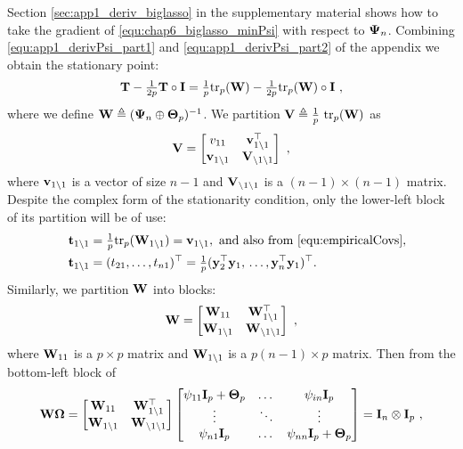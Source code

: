     Section \ref{sec:app1_deriv_biglasso} in the supplementary material shows how to take the gradient of \eqref{equ:chap6_biglasso_minPsi} with respect to $\mathbf{\Psi}_n$.
    Combining
    \eqref{equ:app1_derivPsi_part1} and \eqref{equ:app1_derivPsi_part2} of the appendix  we obtain the stationary point:
    \begin{equation*}
      \mathbf{T} - \tfrac{1}{2p} \mathbf{T} \circ \mathbf{I} = \tfrac{1}{p}\textrm{tr}_p (\mathbf{W}) - \tfrac{1}{2p}\textrm{tr}_p (\mathbf{W}) \circ \mathbf{I} ~,
    \end{equation*}
    where we define $\mathbf{W} \triangleq (\mathbf{\Psi}_n \oplus \mathbf{\Theta}_p)^{-1}$. We partition $\mathbf{V} \triangleq \frac{1}{p}~\textrm{tr}_p (\mathbf{W})$ as
    \begin{equation}
      \mathbf{V} = \begin{bmatrix} v_{11} &\mathbf{v}^\top_{1\setminus1} \\ \mathbf{v}_{1\setminus1} & \mathbf{V}_{\setminus1 \setminus1} \end{bmatrix} ~,
    \end{equation}
    where $\mathbf{v}_{1\setminus1}$ is a vector of size $n-1$ and $\mathbf{V}_{\setminus 1 \setminus 1}$ is a $(n-1) \times (n-1)$ matrix.  Despite the complex form of the stationarity condition, only the lower-left block of its partition will be of use:
    \begin{align} \label{equ:stationary_point}
      \nonumber \mathbf{t}_{1\setminus1} &= \tfrac{1}{p}\textrm{tr}_p (\mathbf{W}_{1\setminus1}) = \mathbf{v}_{1\setminus1},
      ~\textrm{and also from \eqref{equ:empiricalCovs}}, \\ \quad \mathbf{t}_{1\setminus1} &= (t_{21}, \dots,t_{n1})^\top = \tfrac{1}{p}(\mathbf{y}_2^\top \mathbf{y}_1,\, \dots, \mathbf{y}_n^\top \mathbf{y}_1)^\top .
    \end{align}
    Similarly, we partition $\mathbf{W}$ into blocks:
    \[
      \mathbf{W} = \begin{bmatrix} \mathbf{W}_{11} &\mathbf{W}^\top_{1\setminus1} \\ \mathbf{W}_{1\setminus1} & \mathbf{W}_{\setminus1 \setminus1} \end{bmatrix}~,
    \]
    where $\mathbf{W}_{11}$ is a $p \times p$ matrix and $\mathbf{W}_{1\setminus1}$ is a $p(n-1) \times p$ matrix. Then from the bottom-left block of
    \begin{equation} \label{equ:chap6_WOmega}
      \begin{split}
      \mathbf{W}\mathbf{\Omega} = 
      \begin{bmatrix}  \mathbf{W}_{11}	&\mathbf{W}^\top_{1\setminus1} \\ \mathbf{W}_{1\setminus1} & \mathbf{W}_{\setminus1 \setminus1}  \end{bmatrix}
      \begin{bmatrix}  	\psi_{11}\mathbf{I}_p + \mathbf{\Theta}_p 	&\dots 	&\psi_{in}\mathbf{I}_p \\
    		\vdots 				&\ddots 	&\vdots 		\\
    		\psi_{n1}\mathbf{I}_p			&\dots	&\psi_{nn}\mathbf{I}_p + \mathbf{\Theta}_p  \end{bmatrix} 
        = \mathbf{I}_{n} \otimes \mathbf{I}_p ~,
      \end{split}
    \end{equation}
